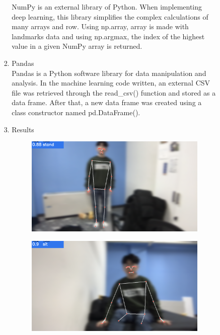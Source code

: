 \documentclass[conference]{IEEEtran}
\begin{document}
\begin{enumerate}[label=\arabic*.]
\begin{enumerate}[label=\arabic*.]
\begin{enumerate}[label=\alph*.]
\begin{enumerate}[label=\roman*.]
            NumPy is an external library of Python. When implementing deep learning, this library simplifies the complex calculations of many arrays and row. Using np.array, array is made with landmarks data and using np.argmax, the index of the highest value in a given NumPy array is returned. \\
            \item{\large{Pandas}}\\ 
            Pandas is a Python software library for data manipulation and analysis. In the machine learning code written, an external CSV file was retrieved through the read\_csv() function and stored as a data frame. After that, a new data frame was created using a class constructor named pd.DataFrame(). \\
        \item{\large{Results}}\\
        \begin{figure}[H]\centering \includegraphics[scale=0.16]{images/stand.png}\end{figure} 
        \begin{figure}[H]\centering \includegraphics[scale=0.16]{images/sit.png}\end{figure} 

\end{enumerate}
\end{enumerate}
\end{enumerate}
\end{enumerate}
\end{document}
